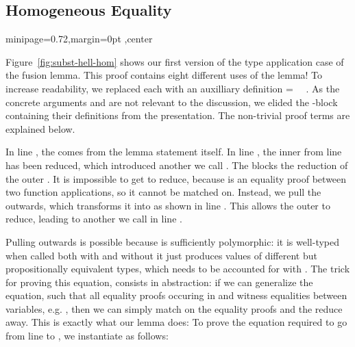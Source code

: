 \documentclass[sigplan,anonymous,review,screen]{acmart}
\newenvironment{AgdaBlock}{%
  \vspace{\AgdaEmptySkip}%
  \AgdaNoSpaceAroundCode{}%
}{%
  \AgdaSpaceAroundCode{}
  \vspace{-\AgdaEmptySkip}
}
\begin{document}
\subsection{Homogeneous Equality}
\label{sec:subst-hell:hom}

\begin{figure*}
  \begin{adjustbox}{minipage=0.72\textwidth,margin=0pt \smallskipamount,center}
    \begin{minipage}{1.0\linewidth}
    \begin{AgdaBlock}
      \SubstExamplesFusionESubESubAlt
      \SubstExamplesFusionESubESubBody
    \end{AgdaBlock}
    \end{minipage}
  \end{adjustbox}
  \caption{Proof of Expression Substitution Fusion with Homogeneous Equality}
  \label{fig:subst-hell-hom}
\end{figure*}

Figure~\ref{fig:subst-hell-hom} shows our first version of the type application case
{} of the fusion lemma.
This proof contains eight different uses of the {\Asubst} lemma!
To increase readability, we replaced each {\Asubst} 
with an auxilliary definition { = \Asubst~~}.
As the concrete arguments {} and {} are not relevant to the
discussion, we elided the -block containing their
definitions from the presentation. The non-trivial proof terms {} are explained below.

In line , the {} comes from the lemma statement itself.
In line , the inner {\AEsub} from line  has been reduced, which
introduced another {\Asubst} we call {}.
The {} blocks the reduction of the outer {\AEsub}.
It is impossible to get {} to reduce, because {} is
an equality proof between two function applications, so it cannot be
matched on.
Instead, we pull the {} outwards, which transforms it into
{} as shown in line . This allows the outer {\AEsub}
to reduce, leading to another {\Asubst} we call {} in line .

Pulling {} outwards is possible because {\AEsub} is sufficiently polymorphic:
it is well-typed when called both with and without {} \textemdash{} it just produces values
of different but propositionally equivalent types, which needs to be accounted for with {}.
The trick for proving this equation, consists in abstraction:
if we can generalize the equation, such that all equality proofs occuring in {}
and  {} witness equalities between variables, e.g. , then
we can simply match on the equality proofs and the {} reduce away.
This is exactly what our {} lemma does:
\SubstExamplesDistSubst
To prove the equation required to go from line  to , we
instantiate {} as follows:
\SubstExamplesFusionESubESubBodyProofA
\end{document}
